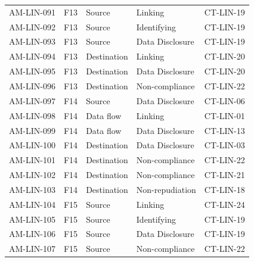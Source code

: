 \begin{footnotesize}
\begin{longtable}{l l p{} p{} l}
        AM-LIN-091 & F13 & Source & Linking & CT-LIN-19 \\
        AM-LIN-092 & F13 & Source & Identifying & CT-LIN-19 \\
        AM-LIN-093 & F13 & Source & Data Disclosure & CT-LIN-19 \\
        AM-LIN-094 & F13 & Destination & Linking & CT-LIN-20 \\
        AM-LIN-095 & F13 & Destination & Data Disclosure & CT-LIN-20 \\
        AM-LIN-096 & F13 & Destination & Non-compliance & CT-LIN-22 \\
        AM-LIN-097 & F14 & Source & Data Disclosure & CT-LIN-06 \\
        AM-LIN-098 & F14 & Data flow & Linking & CT-LIN-01 \\
        AM-LIN-099 & F14 & Data flow & Data Disclosure & CT-LIN-13 \\
        AM-LIN-100 & F14 & Destination & Data Disclosure & CT-LIN-03 \\
        AM-LIN-101 & F14 & Destination & Non-compliance & CT-LIN-22 \\
        AM-LIN-102 & F14 & Destination & Non-compliance & CT-LIN-21 \\
        AM-LIN-103 & F14 & Destination & Non-repudiation & CT-LIN-18 \\
        AM-LIN-104 & F15 & Source & Linking & CT-LIN-24 \\
        AM-LIN-105 & F15 & Source & Identifying & CT-LIN-19 \\
        AM-LIN-106 & F15 & Source & Data Disclosure & CT-LIN-19 \\
        AM-LIN-107 & F15 & Source & Non-compliance & CT-LIN-22 \\
\end{longtable}
\end{footnotesize}

